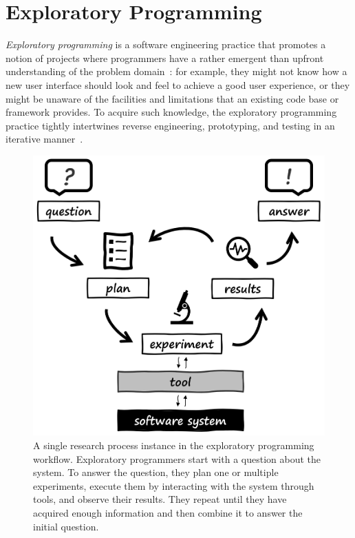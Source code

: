 
\section{Exploratory Programming}
\label{sec:background/exp}

\emph{Exploratory programming} is a software engineering practice that promotes a notion of projects where programmers have a rather emergent than upfront understanding of the problem domain~\cite{sandberg1988smalltalk,kery2017exploring,rein2018exploratory}:
for example, they might not know how a new user interface should look and feel to achieve a good user experience, or they might be unaware of the facilities and limitations that an existing code base or framework provides.
To acquire such knowledge, the exploratory programming practice tightly intertwines reverse engineering, prototyping, and testing in an iterative manner~\cite{taeumel2022pattern}.

\begin{figure}
	\centering
	\includegraphics[width=.7\textwidth]{01_exp/simple_process.png}
	\caption[A single \emph{research process} in the \emph{exploratory programming workflow}.]{
		A single research process instance in the exploratory programming workflow.
		Exploratory programmers start with a question about the system.
		To answer the question, they plan one or multiple experiments, execute them by interacting with the system through tools, and observe their results.
		They repeat until they have acquired enough information and then combine it to answer the initial question.
	}
	\label{fig:background/exp/simple_process}
\end{figure}

